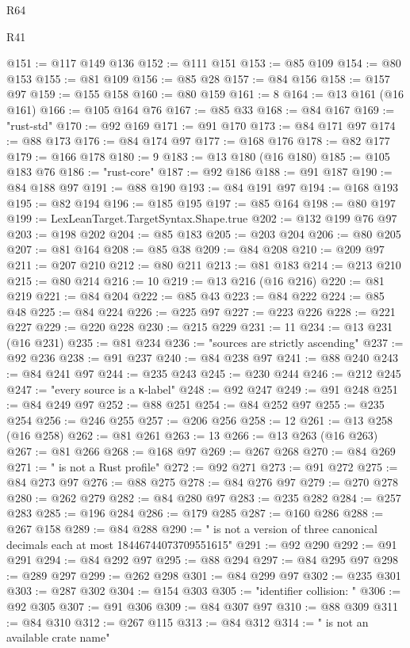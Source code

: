 \begin{lexlean}{R64}
\begin{lexlean}{R41}
\begin{coremodule}
{{{{{{{{{{{{{{{{{{{{{{{{{{{{{{{{{{{{{{{{{{{{{{{{{{{{{{{{{{{{{{{{{{{{{{{{{{{{{{{{{{{{{{{{{@151 := @117 @149 @136
@152 := @111 @151
@153 := @85 @109
@154 := @80 @153
@155 := @81 @109
@156 := @85 @28
@157 := @84 @156
@158 := @157 @97
@159 := @155 @158
@160 := @80 @159
@161 := 8
@164 := @13 @161 (@16 @161)
@166 := @105 @164 @76
@167 := @85 @33
@168 := @84 @167
@169 := "rust-std"
@170 := @92 @169
@171 := @91 @170
@173 := @84 @171 @97
@174 := @88 @173
@176 := @84 @174 @97
@177 := @168 @176
@178 := @82 @177
@179 := @166 @178
@180 := 9
@183 := @13 @180 (@16 @180)
@185 := @105 @183 @76
@186 := "rust-core"
@187 := @92 @186
@188 := @91 @187
@190 := @84 @188 @97
@191 := @88 @190
@193 := @84 @191 @97
@194 := @168 @193
@195 := @82 @194
@196 := @185 @195
@197 := @85 @164
@198 := @80 @197
@199 := LexLeanTarget.TargetSyntax.Shape.true
@202 := @132 @199 @76 @97
@203 := @198 @202
@204 := @85 @183
@205 := @203 @204
@206 := @80 @205
@207 := @81 @164
@208 := @85 @38
@209 := @84 @208
@210 := @209 @97
@211 := @207 @210
@212 := @80 @211
@213 := @81 @183
@214 := @213 @210
@215 := @80 @214
@216 := 10
@219 := @13 @216 (@16 @216)
@220 := @81 @219
@221 := @84 @204
@222 := @85 @43
@223 := @84 @222
@224 := @85 @48
@225 := @84 @224
@226 := @225 @97
@227 := @223 @226
@228 := @221 @227
@229 := @220 @228
@230 := @215 @229
@231 := 11
@234 := @13 @231 (@16 @231)
@235 := @81 @234
@236 := "sources are strictly ascending"
@237 := @92 @236
@238 := @91 @237
@240 := @84 @238 @97
@241 := @88 @240
@243 := @84 @241 @97
@244 := @235 @243
@245 := @230 @244
@246 := @212 @245
@247 := "every source is a κ-label"
@248 := @92 @247
@249 := @91 @248
@251 := @84 @249 @97
@252 := @88 @251
@254 := @84 @252 @97
@255 := @235 @254
@256 := @246 @255
@257 := @206 @256
@258 := 12
@261 := @13 @258 (@16 @258)
@262 := @81 @261
@263 := 13
@266 := @13 @263 (@16 @263)
@267 := @81 @266
@268 := @168 @97
@269 := @267 @268
@270 := @84 @269
@271 := " is not a Rust profile"
@272 := @92 @271
@273 := @91 @272
@275 := @84 @273 @97
@276 := @88 @275
@278 := @84 @276 @97
@279 := @270 @278
@280 := @262 @279
@282 := @84 @280 @97
@283 := @235 @282
@284 := @257 @283
@285 := @196 @284
@286 := @179 @285
@287 := @160 @286
@288 := @267 @158
@289 := @84 @288
@290 := " is not a version of three canonical decimals each at most 18446744073709551615"
@291 := @92 @290
@292 := @91 @291
@294 := @84 @292 @97
@295 := @88 @294
@297 := @84 @295 @97
@298 := @289 @297
@299 := @262 @298
@301 := @84 @299 @97
@302 := @235 @301
@303 := @287 @302
@304 := @154 @303
@305 := "identifier collision: "
@306 := @92 @305
@307 := @91 @306
@309 := @84 @307 @97
@310 := @88 @309
@311 := @84 @310
@312 := @267 @115
@313 := @84 @312
@314 := " is not an available crate name"
}}}}}}}}}}}}}}}}}}}}}}}}}}}}}}}}}}}}}}}}}}}}}}}}}}}}}}}}}}}}}}}}}}}}}}}}}}}}}}}}}}}}}}}}}
\end{coremodule}
\end{lexlean}
\end{lexlean}
